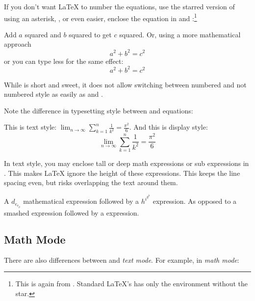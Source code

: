 If you don't want \LaTeX{} to number the equations, use the starred
version of  using an asterisk, , or even easier, enclose the
equation in \csi{[} and \csi{]}:\footnote{
  This is again from .
  Standard \LaTeX{}'s has only the  environment without the star.}
\begin{example}
Add $a$ squared and $b$ squared
to get $c$ squared. Or, using
a more mathematical approach
 \begin{equation*}
   a^2 + b^2 = c^2
 \end{equation*}
or you can type less for the
same effect:
 \[ a^2 + b^2 = c^2 \]
\end{example}
While \csi{[} is short and sweet, it does not allow switching between numbered and not numbered style as easily as
 and .

Note the difference in typesetting style between  and 
equations:
\begin{example}
This is text style: 
$\lim_{n \to \infty} 
 \sum_{k=1}^n \frac{1}{k^2} 
 = \frac{\pi^2}{6}$.
And this is display style:
 \begin{equation}
  \lim_{n \to \infty} 
  \sum_{k=1}^n \frac{1}{k^2} 
  = \frac{\pi^2}{6}
 \end{equation}
\end{example}

In text style, you may enclose tall or deep math expressions or sub
expressions in . This makes \LaTeX{} ignore the height of
these expressions. This keeps the line spacing even, but risks overlapping the
text around them.

\begin{example}[examplewidth=0.45\linewidth]
A $d_{e_{e_p}}$ mathematical
expression  followed by a
$h^{i^{g^h}}$ expression. As
opposed to a smashed 
 expression 
followed by a
 expression.
\end{example}

\subsection{Math Mode}

There are also differences between \emph{} and \emph{text mode}. For
example, in \emph{math mode}:

